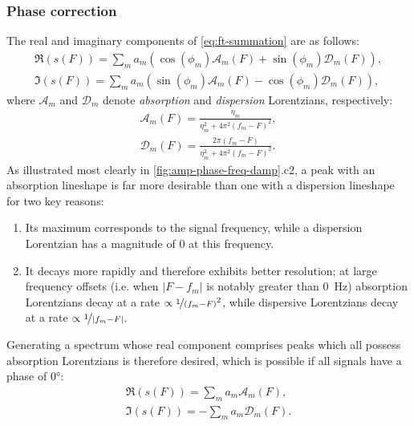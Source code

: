\subsubsection{Phase correction}
The real and imaginary components of \cref{eq:ft-summation} are as follows:
\begin{subequations}
    \begin{gather}
        \Re(s(F)) = \sum_m
        a_m (\cos(\phi_m) \mathcal{A}_m(F) + \sin(\phi_m) \mathcal{D}_m(F)),\\
        \Im(s(F)) = \sum_m
        a_m (\sin(\phi_m) \mathcal{A}_m(F) - \cos(\phi_m) \mathcal{D}_m(F)),
    \end{gather}
\end{subequations}
where $\mathcal{A}_m$ and  $\mathcal{D}_m$ denote \emph{absorption} and
\emph{dispersion} Lorentzians, respectively:
\begin{subequations}
    \begin{gather}
        \mathcal{A}_m(F) = \frac{\eta_m}{\eta_m^2 + 4 \pi^2 (f_m - F)^2},\\
        \mathcal{D}_m(F) = \frac{2 \pi (f_m - F)}{\eta_m^2 + 4 \pi^2 (f_m - F)^2}.
    \end{gather}
\end{subequations}
As illustrated most clearly in \cref{fig:amp-phase-freq-damp}.c2, a peak with
an absorption lineshape is far more desirable than one with a dispersion
lineshape for two key reasons:
\begin{enumerate}
    \item Its maximum corresponds to the signal frequency, while a dispersion
        Lorentzian has a magnitude of $0$ at this frequency.
    \item It decays more rapidly and therefore exhibits better resolution;
        at large frequency offsets (i.e. when $\lvert F - f_m \rvert$ is
        notably greater than \qty{0}{\hertz}) absorption Lorentzians decay at
        a rate $\propto \nicefrac{1}{(f_m - F)}^2$, while dispersive
        Lorentzians decay at a rate $\propto \nicefrac{1}{\lvert f_m - F \rvert}$.
\end{enumerate}
Generating a spectrum whose real component comprises peaks which all possess
absorption Lorentzians is therefore desired, which is possible if all signals
have a phase of \ang{0}:
\begin{subequations}
    \begin{gather}
        \Re(s(F)) = \sum_m a_m \mathcal{A}_m(F),\label{eq:absorption}\\
        \Im(s(F)) = -\sum_m a_m \mathcal{D}_m(F).\label{eq:dispersion}
    \end{gather}
\end{subequations}
